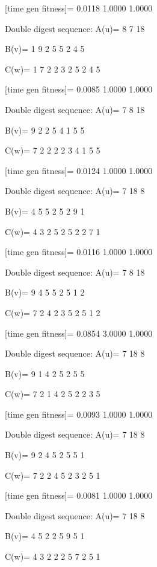 [time gen fitness]=
    0.0118    1.0000    1.0000

Double digest sequence:
A(u)=
     8     7    18

B(v)=
     1     9     2     5     5     2     4     5

C(w)=
     1     7     2     2     3     2     5     2     4     5

[time gen fitness]=
    0.0085    1.0000    1.0000

Double digest sequence:
A(u)=
     7     8    18

B(v)=
     9     2     2     5     4     1     5     5

C(w)=
     7     2     2     2     2     3     4     1     5     5

[time gen fitness]=
    0.0124    1.0000    1.0000

Double digest sequence:
A(u)=
     7    18     8

B(v)=
     4     5     5     2     5     2     9     1

C(w)=
     4     3     2     5     2     5     2     2     7     1

[time gen fitness]=
    0.0116    1.0000    1.0000

Double digest sequence:
A(u)=
     7     8    18

B(v)=
     9     4     5     5     2     5     1     2

C(w)=
     7     2     4     2     3     5     2     5     1     2

[time gen fitness]=
    0.0854    3.0000    1.0000

Double digest sequence:
A(u)=
     7    18     8

B(v)=
     9     1     4     2     5     2     5     5

C(w)=
     7     2     1     4     2     5     2     2     3     5

[time gen fitness]=
    0.0093    1.0000    1.0000

Double digest sequence:
A(u)=
     7    18     8

B(v)=
     9     2     4     5     2     5     5     1

C(w)=
     7     2     2     4     5     2     3     2     5     1

[time gen fitness]=
    0.0081    1.0000    1.0000

Double digest sequence:
A(u)=
     7    18     8

B(v)=
     4     5     2     2     5     9     5     1

C(w)=
     4     3     2     2     2     5     7     2     5     1

